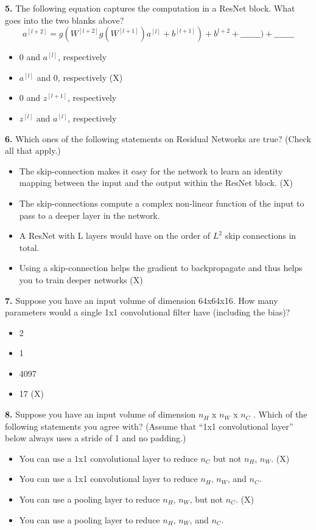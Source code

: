 \textbf{5.} The following equation captures the computation in a ResNet block. What goes into the two blanks above?
\begin{equation*}
    a^{[l+2]}=g(W^{[l+2]}g(W^{[l+1]})a^{[l]}+b^{[l+1]})+b^{l+2}+\_\_\_\_\_\_\_ )+\_\_\_\_\_\_\_
\end{equation*}
\begin{itemize}
    \item 0 and $a^{[l]}$, respectively
    \item $a^{[l]}$ and 0, respectively (X)
    \item 0 and $z^{[l+1]}$, respectively
    \item $z^{[l]}$ and $a^{[l]}$, respectively
\end{itemize}
\textbf{6.} Which ones of the following statements on Residual Networks are true? (Check all that apply.)
\begin{itemize}
    \item The skip-connection makes it easy for the network to learn an identity mapping between the input and the output within the ResNet block. (X)
    \item The skip-connections compute a complex non-linear function of the input to pass to a deeper layer in the network.
    \item A ResNet with L layers would have on the order of $L^2$  skip connections in total.
    \item Using a skip-connection helps the gradient to backpropagate and thus helps you to train deeper networks (X)
\end{itemize}
\textbf{7.} Suppose you have an input volume of dimension 64x64x16. How many parameters would a single 1x1 convolutional filter have (including the bias)?
\begin{itemize}
    \item 2
    \item 1
    \item 4097
    \item 17 (X)
\end{itemize}
\textbf{8.} Suppose you have an input volume of dimension $n_H$ x $n_W$ x $n_C$ . Which of the following statements you agree with? (Assume that “1x1 convolutional layer” below always uses a stride of 1 and no padding.)
\begin{itemize}
    \item You can use a 1x1 convolutional layer to reduce $n_C$ but not $n_H$, $n_W$. (X)
    \item You can use a 1x1 convolutional layer to reduce $n_H$, $n_W$, and $n_C$.
    \item You can use a pooling layer to reduce $n_H$, $n_W$, but not $n_C$. (X)
    \item You can use a pooling layer to reduce $n_H$, $n_W$, and $n_C$.
\end{itemize}
